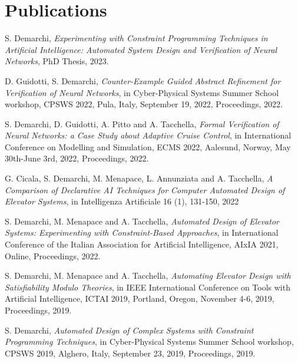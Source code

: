 \section{\sc Publications}

S. Demarchi, \textit{Experimenting with Constraint Programming
	Techniques in Artificial Intelligence: Automated System Design
	and Verification of Neural Networks}, PhD Thesis, 2023.

D. Guidotti, S. Demarchi, \textit{Counter-Example Guided Abstract
	Refinement for Verification of Neural Networks}, in
Cyber-Physical Systems Summer School workshop, CPSWS 2022, Pula, 
Italy, September 19, 2022, Proceedings, 2022.


S. Demarchi, D. Guidotti, A. Pitto and A. Tacchella, \textit{Formal
	 Verification of Neural Networks: a Case Study about Adaptive 
	 Cruise Control}, in International Conference on Modelling and
Simulation, ECMS 2022, Aalesund, Norway, May 30th-June 3rd, 2022,
Proceedings, 2022.

G. Cicala, S. Demarchi, M. Menapace, L. Annunziata and A. Tacchella,
\textit{A Comparison of Declarative AI Techniques for Computer 
	Automated Design of Elevator Systems}, in Intelligenza Artificiale
16 (1), 131-150, 2022

S. Demarchi, M. Menapace and A. Tacchella, \textit{Automated Design 
	of Elevator Systems: Experimenting with Constraint-Based 
	Approaches}, in International Conference of the Italian 
Association for Artificial Intelligence, AIxIA 2021, Online,
Proceedings, 2022.

S. Demarchi, M. Menapace and A. Tacchella, \textit{Automating Elevator 
	Design with Satisfiability Modulo Theories}, in IEEE International 
Conference on Tools with Artificial Intelligence, ICTAI 2019, Portland, 
Oregon, November 4-6, 2019, Proceedings, 2019.

S. Demarchi, \textit{Automated Design of Complex Systems with Constraint 
	Programming Techniques}, in Cyber-Physical Systems Summer School 
workshop, CPSWS 2019, Alghero, Italy, September 23, 2019, Proceedings, 
2019.